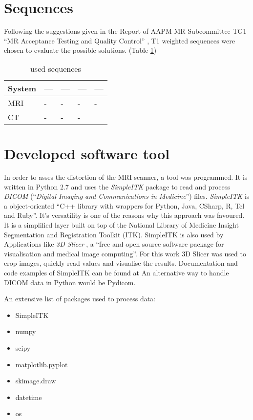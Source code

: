 \section{Sequences}
Following the suggestions given in the Report of AAPM MR Subcommittee TG1 ``MR Acceptance Testing and
Quality Control'' \cite{Jackson2009}, T1 weighted sequences were chosen to evaluate the possible solutions. (Table \ref{tab:settings})

\begin{table}[h]
\centering
\begin{tabular}{@{}lllll@{}}
System & ---  & --- &  --- & --- \\
\toprule
MRI    & -   & -   & -   & -    \\
CT     & -   & -   & -   &
\end{tabular}
\caption{used sequences}
\label{tab:settings}
\end{table}

\section{Developed software tool}

In order to asses the distortion of the MRI scanner, a tool was programmed.
It is written in Python 2.7 and uses the \textit{SimpleITK} package to read and process \textit{DICOM} (``\textit{Digital Imaging and Communications in Medicine}'') files. \cite{Python, DICOM}
\textit{SimpleITK} is a object-oriented ``C++ library with wrappers for Python, Java, CSharp, R, Tcl and Ruby''. \cite{SimpleITK, SimpleITK_started} It's versatility is one of the reasons why this approach was favoured.
It is a simplified layer built on top of the National Library of Medicine Insight Segmentation and Registration Toolkit (ITK). SimpleITK is also used by Applications like \textit{3D Slicer} , a ``free and open source software package for
visualisation and medical image computing''. \cite{3DSlicer, Kikinis2012} For this work 3D Slicer was used to crop images, quickly read values and visualise the results.
Documentation and code examples of SimpleITK can be found at \cite{InsightSoftwareConsortium, Kyriakou-SimpleITK}
An alternative way to handle DICOM data in Python would be Pydicom. \cite{Pydicom, Kyriakou-Pydicom-VTK} 

An extensive list of packages used to process data:
\begin{itemize}
 \item SimpleITK
 \item numpy
 \item scipy
 \item matplotlib.pyplot \cite{Hunter2007}
 \item skimage.draw
 \item datetime
 \item os
\end{itemize}


